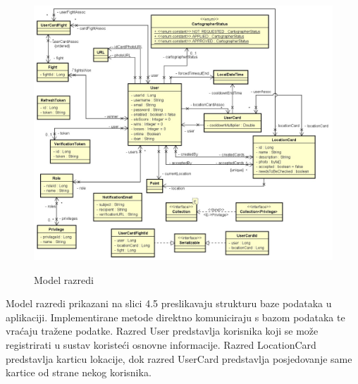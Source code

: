 			\begin{figure}[H]
				\centering
				\includegraphics[scale=0.75]{slike/modelCD} \\
				\caption{ Model razredi}
				\label{fig:modelCD}
			\end{figure}
		
			\textnormal{Model razredi prikazani na slici 4.5 preslikavaju strukturu baze podataka u aplikaciji. Implementirane metode direktno komuniciraju s bazom podataka te vraćaju tražene podatke. Razred User predstavlja korisnika koji se može registrirati u sustav koristeći osnovne informacije. Razred LocationCard predstavlja karticu lokacije, dok razred UserCard predstavlja posjedovanje same kartice od strane nekog korisnika.} \\
			
